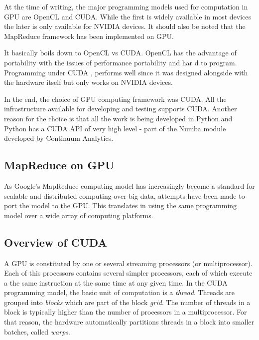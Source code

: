 At the time of writing, the major programming models used for computation in GPU are OpenCL and CUDA. While the first is widely available in most devices the later is only available for NVIDIA devices.
It should also be noted that the MapReduce framework has been implemented on GPU.



It basically boils down to OpenCL vs CUDA. OpenCL has the advantage of portability with the issues of performance portability and har d to program. Programming under CUDA , performs well since it was designed alongside with the hardware itself but only works on NVIDIA devices.






In the end, the choice of GPU computing framework was CUDA. All the infrastructure available for developing and testing supports CUDA. Another reason for the choice is that all the work is being developed in Python and Python has a CUDA API of very high level - part of the Numba module developed by Continuum Analytics. 






\subsection{MapReduce on GPU}
As Google's MapReduce computing model has increasingly become a standard for scalable and distributed computing over big data, attempts have been made to port the model to the GPU. This translates in using the same programming model over a wide array of computing platforms.


\subsection{Overview of CUDA}

A GPU is constituted by one or several streaming processors (or multiprocessor). Each of this processors contains several simpler processors, each of which execute a the same instruction at the same time at any given time.
In the CUDA programming model, the basic unit of computation is a \emph{thread}. Threads are grouped into \emph{blocks} which are part of the block \emph{grid}. The number of threads in a block is typically higher than the number of processors in a multiprocessor. For that reason, the hardware automatically partitions threads in a block into smaller batches, called \emph{warps}.

